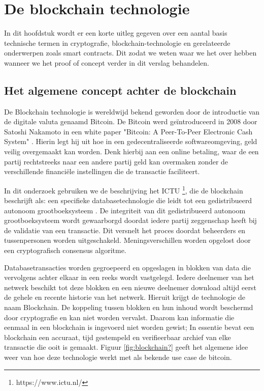\chapter{De blockchain technologie}\label{chap:q1}
In dit hoofdstuk wordt er een korte uitleg gegeven over een aantal basis technische termen in cryptografie, blockchain-technologie en gerelateerde onderwerpen zoals smart contracts. Dit zodat we weten waar we het over hebben wanneer we het proof of concept verder in dit verslag behandelen.

\section{Het algemene concept achter de blockchain}
De Blockchain technologie is wereldwijd bekend geworden door de introductie van de digitale valuta genaamd Bitcoin. De Bitcoin werd geïntroduceerd in 2008 door Satoshi Nakamoto in een white paper "Bitcoin: A Peer-To-Peer Electronic Cash System" \cite{bitcoinPaper}. Hierin legt hij uit hoe in een gedecentraliseerde softwareomgeving, geld veilig overgemaakt kan worden. Denk hierbij aan een online betaling, waar de een partij rechtstreeks naar een andere partij geld kan overmaken zonder de verschillende financiële instellingen die de transactie faciliteert.\par

In dit onderzoek gebruiken we de beschrijving het ICTU \footnote{https://www.ictu.nl/}, die de blockchain beschrijft als: een specifieke databasetechnologie die leidt tot een gedistribueerd autonoom grootboeksysteem \cite{kaptijn}. De integriteit van dit gedistribueerd autonoom grootboeksysteem wordt gewaarborgd doordat iedere partij zeggenschap heeft bij de validatie van een transactie. Dit versnelt het proces doordat beheerders en tussenpersonen worden uitgeschakeld. Meningsverschillen worden opgelost door een cryptografisch consensus algoritme.\par
\newpage

Databasetransacties worden gegroepeerd en opgeslagen in blokken van data die vervolgens achter elkaar in een reeks wordt vastgelegd. Iedere deelnemer van het netwerk beschikt tot deze blokken en een nieuwe deelnemer download altijd eerst de gehele en recente historie van het netwerk. Hieruit krijgt de technologie de naam Blockchain. De koppeling tussen blokken en hun inhoud wordt beschermd door cryptografie en kan niet worden vervalst. Daarom kan informatie die eenmaal in een blockchain is ingevoerd niet worden gewist; In essentie bevat een blockchain een accuraat, tijd gestempeld en verifieerbaar archief van elke transactie die ooit is gemaakt. Figuur \ref{fig:blockchain?} geeft het algemene idee weer van hoe deze technologie werkt met als bekende use case de bitcoin.\par

